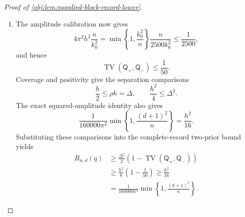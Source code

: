 \begin{proof}[Proof of \cref{obj:lem:supplied-block-record-lower}]
\begin{enumerate}
The common-marginal identity in
\cref{obj:lem:baseline-translation-affinity} identifies
\(\mathcal E_{\mathrm{joint}}\) as the unhalved squared Hellinger distance between \(\mathsf J_+\) and \(\mathsf J_-\).
For completeness, the sharper total-variation comparison used here follows directly from Cauchy--Schwarz. Define the common reference measure by
\[
\mu_{\mathrm{cb}}(dz,dw,dy)=D(dz,dw)\,dy.
\]
Normalization and the definition of the energy imply
\[
\int
\left(
\sqrt{\lambda^{\mathrm{cb}}_{1,h}}
+
\sqrt{\lambda^{\mathrm{cb}}_{-1,h}}
\right)^2d\mu_{\mathrm{cb}}
=
4-\mathcal E_{\mathrm{joint}}.
\]
Consequently,
\[
\begin{aligned}
\operatorname{TV}(\mathsf J_+,\mathsf J_-)
&=
\frac12\int
\left|\lambda^{\mathrm{cb}}_{1,h}
-\lambda^{\mathrm{cb}}_{-1,h}\right|d\mu_{\mathrm{cb}}\\
&\le
\frac12
\sqrt{\mathcal E_{\mathrm{joint}}}
\sqrt{4-\mathcal E_{\mathrm{joint}}}\\
&=
\sqrt{\mathcal E_{\mathrm{joint}}
\left(1-\mathcal E_{\mathrm{joint}}/4\right)}
\le
\sqrt{\mathcal E_{\mathrm{joint}}}.
\end{aligned}
\]
The densities in these integrals are evaluated at \((y\mid z,w)\). Together with the recording-map bound, this proves
\[
\operatorname{TV}(\mathsf Q_+,\mathsf Q_-)
\le
\sqrt{4\pi^2h^2\frac{n}{k_0^2}}.
\]

\item The amplitude calibration now gives
\[
4\pi^2h^2\frac{n}{k_0^2}
=
\min\left\{1,\frac{k_0^2}{n}\right\}
\frac{n}{2500k_0^2}
\le\frac1{2500},
\]
and hence
\[
\operatorname{TV}(\mathsf Q_+,\mathsf Q_-)\le\frac1{50}.
\]
Coverage and positivity give the separation comparisons
\[
\frac h2\le\rho h=\Delta,
\qquad
\frac{h^2}{4}\le\Delta^2.
\]
The exact squared-amplitude identity also gives
\[
\frac{1}{160000\pi^2}
\min\left\{1,\frac{(d+1)^2}{n}\right\}
=\frac{h^2}{16}.
\]
Substituting these comparisons into the complete-record two-prior bound yields
\[
\begin{aligned}
R_{n,d}(q)
&\ge
\frac{\Delta^2}{2}
\left(1-\operatorname{TV}(\mathsf Q_+,\mathsf Q_-)\right)\\
&\ge
\frac{h^2}{8}\left(1-\frac1{50}\right)
\ge\frac{h^2}{16}\\
&=
\frac{1}{160000\pi^2}
\min\left\{1,\frac{(d+1)^2}{n}\right\}.
\end{aligned}
\]


\end{enumerate}
\end{proof}
